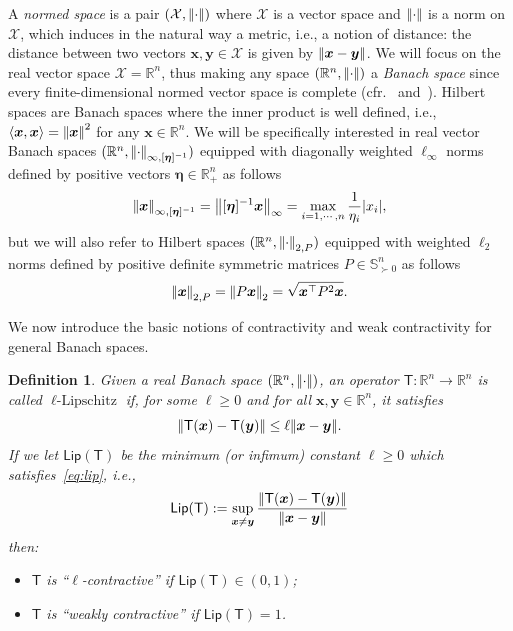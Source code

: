 \documentclass[journal,twoside,web]{ieeecolor}
\newcommand{\virg}[1]{``#1''}
\newcommand{\abs}[1]{{\left\vert #1 \right\vert}}
\newcommand{\norm}[1]{{\left\vert\kern-0.25ex\left\vert #1\right\vert\kern-0.25ex\right\vert}}
\newcommand{\rea }{\mathbb{R}}
\newcommand{\xb}{\boldsymbol{x}}
\newcommand{\yb}{\boldsymbol{y}}
\newcommand{\etab}{\boldsymbol{\eta}}
\newcommand{\Xc}{\mathcal{X}}
\newcommand{\Ts}{\mathsf{T}}
\newcommand{\Lip}{\mathsf{Lip}}
\newtheorem{defn}{Definition}
\begin{document}
A \textit{normed space} is a pair $(\Xc,\norm{\cdot})$ where $\Xc$ is a vector space and $\norm{\cdot}$ is a norm on $\Xc$, which induces in the natural way a metric, i.e., a notion of distance: the distance between two vectors $\xb,\yb\in\Xc$ is given by $\norm{\xb-\yb}$.
%
We will focus on the real vector space $\Xc=\mathbb{R}^n$, thus making any space $(\rea^n,\norm{\cdot})$ a \textit{Banach space} since every finite-dimensional normed vector space is complete (cfr.~\cite[Def. 1.5 and Rem. 2 on page 7]{Berinde07} and~\cite[Theorem 5.33]{Hunter2001}). 
%
Hilbert spaces are Banach spaces where the inner product is well defined, i.e., $\langle \xb,\xb\rangle =\norm{\xb}^2$ for any $\xb\in\rea^n$.
%
We will be specifically interested in real vector Banach spaces $(\rea^n,\norm{\cdot}_{\infty,[\etab]^{-1}})$ equipped with diagonally weighted $\ell_{\infty}$ norms defined by positive vectors $\etab\in\rea^n_+$ as follows
%
$$
\norm{\xb}_{\infty,[\etab]^{-1}} = \norm{[\etab]^{-1}\xb}_{\infty} = \max_{i=1,\cdots,n} \frac{1}{\eta_i} \abs{x_i},
$$
but we will also refer to Hilbert spaces $(\rea^n,\norm{\cdot}_{2,P})$ equipped with weighted $\ell_{2}$ norms defined by positive definite symmetric matrices $P \in \mathbb{S}^n_{\succ 0}$ as follows
%
$$
\norm{\xb}_{2,P} = \norm{P\xb}_{2} = \sqrt{\xb^\top P^2 \xb}.
$$


We now introduce the basic notions of contractivity and weak contractivity for general Banach spaces.
%
\begin{defn}
%
\cite{berinde2021fixed} Given a real Banach space ${(\rea^n,\norm{\cdot})}$, an operator ${\Ts:\rea^n\rightarrow\rea^n}$ is called $\ell\text{-Lipschitz}$ if, for some $\ell \geq0$ and for all $\xb,\yb \in \rea^n$, it satisfies
\begin{equation}\label{eq:lip}
\norm{\Ts(\xb)-\Ts(\yb)} \leq \ell \norm{\xb-\yb}.
\end{equation}
%
If we let $\Lip(\Ts)$ be the minimum (or infimum) constant $\ell\geq 0$ which satisfies~\eqref{eq:lip}, i.e.,
%
$$
\Lip(\Ts) := \sup_{\xb\neq \yb} \frac{\norm{\Ts(\xb)-\Ts(\yb)}}{\norm{\xb-\yb}}
$$
%
then:
%
\begin{itemize}
    \item $\Ts$ is \virg{$\ell$-contractive} if $\Lip(\Ts) \in(0,1)$;
    \item $\Ts$ is  \virg{weakly contractive} if $\Lip(\Ts)=1$.
\end{itemize}
\end{defn}
\end{document}
